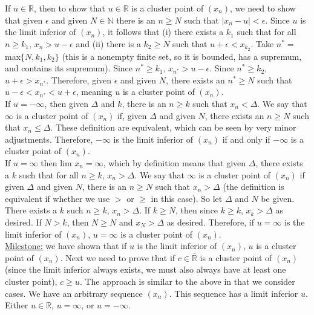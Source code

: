 \documentclass[a4paper]{article}
\begin{document}
If $u \in \mathbb{R}$, then to show that $u \in \mathbb{R}$ is a cluster point of $(x_n)$, we need to show that given $\epsilon$ and given $N \in \mathbb{N}$ there is an $n \geq N$ such that $|x_n-u| < \epsilon$. Since $u$ is the limit inferior of $(x_n)$, it follows that (i)  there exists a $k_1$ such that for all $n \geq k_1$, $x_n > u - \epsilon$ and (ii) there is a $k_2 \geq N$ such that $u + \epsilon < x_{k_2}$. Take $n^* = $ max$\{N,k_1,k_2\}$ (this is a nonempty finite set, so it is bounded, has a supremum, and contains its supremum). Since $n^* \geq k_1$, $x_{n^*} > u - \epsilon$. Since $n^* \geq k_2$, $u + \epsilon > x_{n^*}$. Therefore, given $\epsilon$ and given $N$, there exists an $n^* \geq N$ such that $u - \epsilon < x_{n^*} < u + \epsilon$, meaning $u$ is a cluster point of $(x_n)$.\\

If $u = -\infty$, then given $\Delta$ and $k$, there is an $n \geq k$ such that $x_n < \Delta$. We say that $\infty$ is a cluster point of $(x_n)$ if, given $\Delta$ and given $N$, there exists an $n \geq N$ such that $x_n \leq \Delta$. These definition are equivalent, which can be seen by very minor adjustments. Therefore, $-\infty$ is the limit inferior of $(x_n)$ if and only if $-\infty$ is a cluster point of $(x_n)$. \\

If $u = \infty$ then lim $x_n = \infty$, which by definition means that given $\Delta$, there exists a $k$ such that for all $n \geq k$, $x_n > \Delta$. We say that $\infty$ is a cluster point of $(x_n)$ if given $\Delta$ and given $N$, there is an $n \geq N$ such that $x_n > \Delta$ (the definition is equivalent if whether we use $>$ or $\geq$ in this case). So let $\Delta$ and $N$ be given. There exists a $k$ such $n \geq k$, $x_n > \Delta$. If $k \geq N$, then since $k\geq k$, $x_k > \Delta$ as desired. If $N>k$, then $N\geq N$ and $x_N > \Delta$ as desired. Therefore, if $u = \infty$ is the limit inferior of $(x_n)$, $u = \infty$ is a cluster point of $(x_n)$. \\

\underline{Milestone:} we have shown that if $u$ is the limit inferior of $(x_n)$, $u$ is a cluster point of $(x_n)$. Next we need to prove that if $c \in \overline{\mathbb{R}}$ is a cluster point of $(x_n)$ (since the limit inferior always exists, we must also always have at least one cluster point), $c\geq u$. The approach is similar to the above in that we consider cases. We have an arbitrary sequence $(x_n)$. This sequence has a limit inferior $u$. Either $u \in \mathbb{R}$, $u = \infty$, or $u = -\infty$.\\
\end{document}
